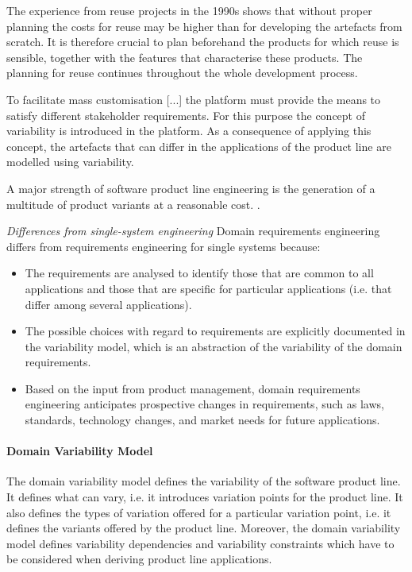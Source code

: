 The experience from reuse projects in the 1990s shows that without proper planning the costs for reuse may be higher than for developing the artefacts from scratch. It is therefore crucial to plan beforehand the products for which reuse is sensible, together with the features that characterise these products. The planning for reuse continues throughout the whole development process. \cite{book:introduction-to-spl}

To facilitate mass customisation [...] the platform must provide the means to satisfy different stakeholder requirements. For this purpose the concept of variability is introduced in the platform. As a consequence of applying this concept, the artefacts that can differ in the applications of the product line are modelled using variability. \cite{book:introduction-to-spl}

A major strength of software product line engineering is the generation of a multitude of product variants at a reasonable cost. \cite{book:introduction-to-spl}.

\textit{Differences from single-system engineering}
Domain requirements engineering differs from requirements engineering for single systems because:
\begin{itemize}
   \item The requirements are analysed to identify those that are common to all applications and those that are specific for particular applications (i.e. that differ among several applications).
   \item The possible choices with regard to requirements are explicitly documented in the variability model, which is an abstraction of the variability of the domain requirements.
   \item Based on the input from product management, domain requirements engineering anticipates prospective changes in requirements, such as laws, standards, technology changes, and market needs for future applications.
\end{itemize}
\cite{book:introduction-to-spl}

\paragraph{Domain Variability Model}
The domain variability model defines the variability of the software product line. It defines what can vary, i.e. it introduces variation points for the product line. It also defines the types of variation offered for a particular variation point, i.e. it defines the variants offered by the product line. Moreover, the domain variability model defines variability dependencies and variability constraints which have to be considered when deriving product line applications. \cite{book:introduction-to-spl}

